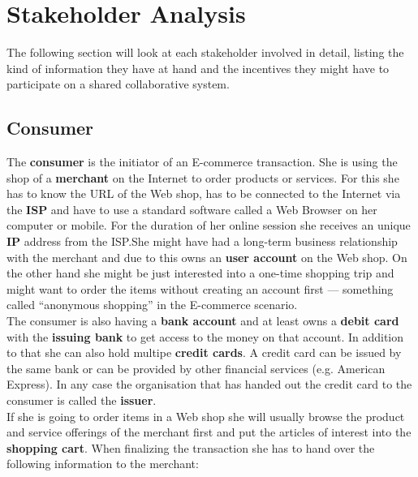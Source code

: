 
\section{Stakeholder Analysis}
\label{sec:stakeholder_analysis}

The following section will look at each stakeholder involved in detail, listing the kind of information they have at hand and the incentives they might have to participate on a shared collaborative system. \\

\subsection{Consumer}
\label{subsec:stakeholder_consumer}

The \textbf{consumer} is the initiator of an E-commerce transaction. She is using the shop of a \textbf{merchant} on the Internet to order products or services. For this she has to know the \gls{URL} of the Web shop, has to be connected to the Internet via the \textbf{\gls{ISP}} and have to use a standard software called a Web Browser on her computer or mobile. For the duration of her online session she receives an unique \textbf{\gls{IP}} address from the ISP.\@ She might have had a long-term business relationship with the merchant and due to this owns an \textbf{user account} on the Web shop. On the other hand she might be just interested into a one-time shopping trip and might want to order the items without creating an account first --- something called ``anonymous shopping'' in the E-commerce scenario. \\

The consumer is also having a \textbf{bank account} and at least owns a \textbf{debit card} with the \textbf{issuing bank} to get access to the money on that account. In addition to that she can also hold multipe \textbf{credit cards}. A credit card can be issued by the same bank or can be provided by other financial services (e.g. American Express). In any case the organisation that has handed out the credit card to the consumer is called the \textbf{issuer}. \\

If she is going to order items in a Web shop she will usually browse the product and service offerings of the merchant first and put the articles of interest into the \textbf{shopping cart}. When finalizing the transaction she has to hand over the following information to the merchant:\@

